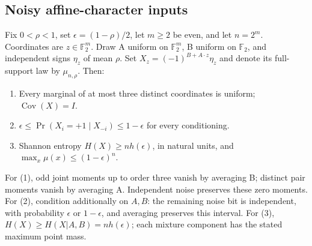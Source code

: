 \subsection{Noisy affine-character
inputs}\label{proof:higher_order_obstructions:noisy-affine-character-inputs}

Fix \(0 < \rho  < 1\), set \(\epsilon  = (1-\rho )/2\), let \(m \ge  2\)
be even, and let \(n = 2^{m}\). Coordinates are
\(z \in  \mathbb F_2^m\). Draw A uniform on \(\mathbb F_2^m\), B uniform
on \(\mathbb F_2\), and independent signs \(\eta _z\) of mean \(\rho\).
Set \(X_z = (-1)^{B+A\cdot z}\eta _z\) and denote its full-support law
by \(\mu_{n,\rho}\). Then:

\begin{enumerate}
\def\labelenumi{\arabic{enumi}.}
\tightlist
\item
  Every marginal of at most three distinct coordinates is uniform;
  \(\operatorname{Cov}(X)=I\).
\item
  \(\epsilon  \le  \Pr (X_i=+1\mid X_{-i}) \le  1-\epsilon\) for every
  conditioning.
\item
  Shannon entropy \(H(X) \ge  n h(\epsilon )\), in natural units, and
  \(\max _{x}\mu (x) \le  (1-\epsilon )^{n}\).
\end{enumerate}

For (1), odd joint moments up to order three vanish by averaging B;
distinct pair moments vanish by averaging A. Independent noise preserves
these zero moments. For (2), condition additionally on \(A,B\): the
remaining noise bit is independent, with probability \(\epsilon\) or
\(1-\epsilon\), and averaging preserves this interval. For (3),
\(H(X) \ge  H(X|A,B) = n h(\epsilon )\); each mixture component has the
stated maximum point mass.
